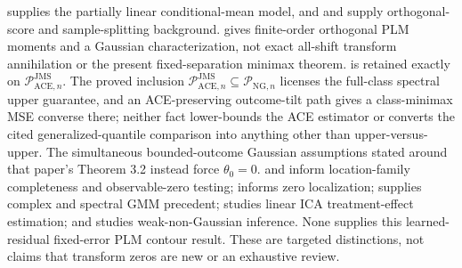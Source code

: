 \cite{Robinson1988} supplies the partially linear conditional-mean model, and \cite{ChernozhukovEtAl2018DML} and \cite{NeweyRobins2018} supply orthogonal-score and sample-splitting background. \cite{MackeySyrgkanisZadik2018} gives finite-order orthogonal PLM moments and a Gaussian characterization, not exact all-shift transform annihilation or the present fixed-separation minimax theorem. \cite[Theorem 5.4, condition (21), and bound (22)]{JinMackeySyrgkanis2025} is retained exactly on \(\mathcal P_{\mathrm{ACE},n}^{\mathrm{JMS}}\). The proved inclusion \(\mathcal P_{\mathrm{ACE},n}^{\mathrm{JMS}}\subseteq\mathcal P_{\mathrm{NG},n}\) licenses the full-class spectral upper guarantee, and an ACE-preserving outcome-tilt path gives a class-minimax MSE converse there; neither fact lower-bounds the ACE estimator or converts the cited generalized-quantile comparison into anything other than upper-versus-upper. The simultaneous bounded-outcome Gaussian assumptions stated around that paper's Theorem 3.2 instead force \(\theta_0=0\). \cite{Mattner1992} and \cite{HuShiu2022} inform location-family completeness and observable-zero testing; \cite{DinhGhoshTranTran2021} informs zero localization; \cite{ChackoViceira2003} supplies complex and spectral GMM precedent; \cite{ReizingerEtAl2025} studies linear ICA treatment-effect estimation; and \cite{LeeMesters2024} studies weak-non-Gaussian inference. None supplies this learned-residual fixed-error PLM contour result. These are targeted distinctions, not claims that transform zeros are new or an exhaustive review.